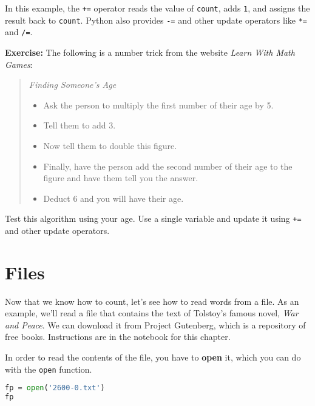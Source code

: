In this example, the \passthrough{\lstinline!+=!} operator reads the
value of \passthrough{\lstinline!count!}, adds
\passthrough{\lstinline!1!}, and assigns the result back to
\passthrough{\lstinline!count!}. Python also provides
\passthrough{\lstinline!-=!} and other update operators like
\passthrough{\lstinline!*=!} and \passthrough{\lstinline!/=!}.

\textbf{Exercise:} The following is a number trick from the website
\emph{Learn With Math Games}:

\begin{quote}
\emph{Finding Someone's Age}

\begin{itemize}
\item
  Ask the person to multiply the first number of their age by 5.
\item
  Tell them to add 3.
\item
  Now tell them to double this figure.
\item
  Finally, have the person add the second number of their age to the
  figure and have them tell you the answer.
\item
  Deduct 6 and you will have their age.
\end{itemize}
\end{quote}

Test this algorithm using your age. Use a single variable and update it
using \passthrough{\lstinline!+=!} and other update operators.

\section{Files}\label{files}

Now that we know how to count, let's see how to read words from a file.
As an example, we'll read a file that contains the text of Tolstoy's
famous novel, \emph{War and Peace}. We can download it from Project
Gutenberg, which is a repository of free books. Instructions are in the
notebook for this chapter.

In order to read the contents of the file, you have to \textbf{open} it,
which you can do with the \passthrough{\lstinline!open!} function.

\begin{lstlisting}[language=Python,style=source]
fp = open('2600-0.txt')
fp
\end{lstlisting}


